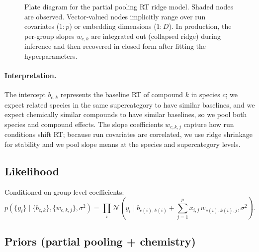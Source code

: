 \documentclass[11pt]{article}
\begin{document}
\begin{figure}[H]
\caption{Plate diagram for the partial pooling RT ridge model. Shaded nodes are observed. Vector-valued nodes implicitly range over run covariates ($1\!:\!p$) or embedding dimensions ($1\!:\!D$). In production, the per-group slopes $w_{c,k}$ are integrated out (collapsed ridge) during inference and then recovered in closed form after fitting the hyperparameters.}
\label{fig:rt_partial_pool_plate}
\end{figure}

\paragraph{Interpretation.}
The intercept $b_{c,k}$ represents the baseline RT of compound $k$ in species $c$; we expect related species in the same
supercategory to have similar baselines, and we expect chemically similar compounds to have similar baselines, so we pool
both species and compound effects. The slope coefficients $w_{c,k,j}$ capture how run conditions shift RT; because run
covariates are correlated, we use ridge shrinkage for stability and we pool slope means at the species and supercategory
levels.

\subsection{Likelihood}

Conditioned on group-level coefficients:
\[
  p(\{y_i\}\mid \{b_{c,k}\}, \{w_{c,k,j}\}, \sigma^2)
  = \prod_{i} \mathcal{N}\!\left(
    y_i \mid b_{c(i),k(i)} + \sum_{j=1}^{p} x_{i,j}\,w_{c(i),k(i),j}, \sigma^2
  \right).
\]

\subsection{Priors (partial pooling + chemistry)}
\end{document}
